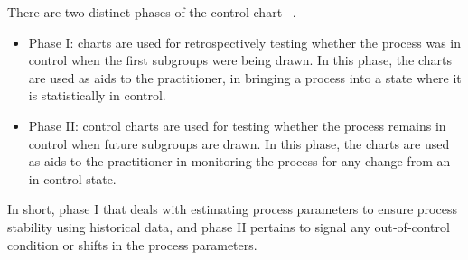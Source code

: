 There are two distinct phases of the control chart
~\cite{bersimis2007multivariate}.

\begin{itemize}
\item Phase I: charts are used for retrospectively testing whether the process was in control when the first
subgroups were being drawn. In this phase, the charts are used as aids to the practitioner, in bringing a
process into a state where it is statistically in control.
\item Phase II: control charts are used for testing whether the process remains in control when future subgroups
are drawn. In this phase, the charts are used as aids to the practitioner in monitoring the process for any
change from an in-control state.
\end{itemize}

In short, phase I that deals with estimating process parameters to ensure process
stability using historical data, and phase II pertains to signal
any out‐of‐control condition or shifts in the process
parameters.






